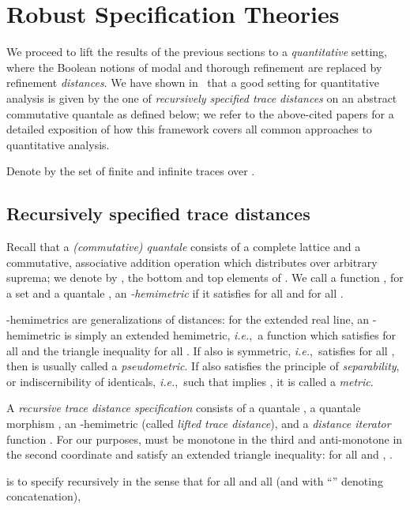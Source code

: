 \documentclass[twocolumn]{svjour3-dummy}
\newcommand*\ie{\textit{i.e.},}
\begin{document}
\section{Robust Specification Theories}
\label{se:quant}

We proceed to lift the results of the previous sections to a
\emph{quantitative} setting, where the Boolean notions of modal and
thorough refinement are replaced by refinement \emph{distances}.  We
have shown in~\cite{DBLP:conf/fsttcs/FahrenbergLT11, DBLP:conf/aplas/FahrenbergL13,
  DBLP:conf/csr/BauerFLT12, DBLP:journals/tcs/FahrenbergL14,
  DBLP:journals/acta/FahrenbergL14} that a good setting for
quantitative analysis is given by the one of \emph{recursively
  specified trace distances} on an abstract commutative quantale as
defined below; we refer to the above-cited papers for a detailed
exposition of how this framework covers all common approaches to
quantitative analysis.

Denote by  the set of finite
and infinite traces over .

\subsection{Recursively specified trace distances}

Recall that a \emph{(commutative) quantale} consists of a complete
lattice  and a commutative, associative
addition operation  which distributes over arbitrary
suprema; we denote by ,  the bottom and top elements
of .  We call a function , for a set  and a
quantale , an \emph{-hemimetric} if it satisfies  for all  and  for all .

-hemimetrics are generalizations of distances: for  the extended real line, an -hemimetric is simply an extended hemimetric, \ie~a function
 which satisfies 
for all  and the triangle inequality  for all .  If  also is symmetric,
\ie~satisfies  for all , then  is
usually called a \emph{pseudometric}.  If  also satisfies the
principle of \emph{separability}, or indiscernibility of identicals,
\ie~such that  implies , it is called a
\emph{metric}.

A \emph{recursive trace distance specification}  consists of a quantale , a quantale morphism , an -hemimetric  (called \emph{lifted trace
  distance}), and a \emph{distance iterator} function .  For our purposes,  must be monotone in
the third and anti-monotone in the second coordinate and satisfy an
extended triangle inequality: for all  and , .

 is to specify  recursively in the sense that for all  and all  (and with ``''
denoting concatenation),
\end{document}
